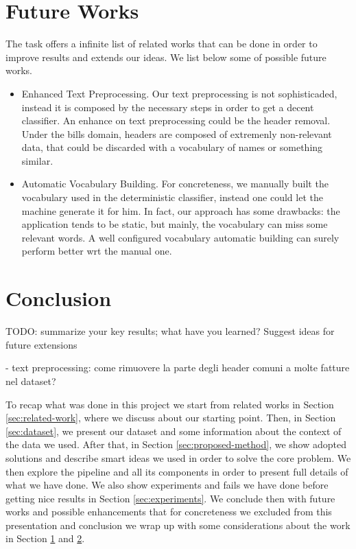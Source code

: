 \documentclass[10pt,twocolumn,letterpaper]{article}
\begin{document}
\section{Future Works}
\label{sec:future-works}

The task offers a infinite list of related works that can be done in
order to improve results and extends our ideas. We list below some of
possible future works.

\begin{itemize}
  \item Enhanced Text Preprocessing. Our text preprocessing is not
    sophisticaded, instead it is composed by the necessary steps in
    order to get a decent classifier. An enhance on text preprocessing
    could be the header removal. Under the bills domain, headers are
    composed of extremenly non-relevant data, that could be discarded
    with a vocabulary of names or something similar.
  \item Automatic Vocabulary Building. For concreteness, we manually
    built the vocabulary used in the deterministic classifier, instead
    one could let the machine generate it for him. In fact, our
    approach has some drawbacks: the application tends to be static,
    but mainly, the vocabulary can miss some relevant words. A well
    configured vocabulary automatic building can surely perform better
    wrt the manual one. 
\end{itemize}

\section{Conclusion}
\label{sec:conclusion}

TODO: summarize your key results; what have you
learned? Suggest ideas for future extensions

- text preprocessing: come rimuovere la parte degli header comuni a molte fatture nel dataset?

To recap what was done in this project we start from related works in Section
\ref{sec:related-work}, where we discuss about our starting
point. Then, in Section \ref{sec:dataset}, we present our dataset and
some information about the context of the data we used. After that, in
Section \ref{sec:proposed-method}, we show adopted solutions and
describe smart ideas we used in order to solve the core problem. We
then explore the pipeline and all its components in order to present
full details of what we have done. We also show experiments and fails
we have done before getting nice results in Section
\ref{sec:experiments}. We conclude then with future works and possible
enhancements that for concreteness we excluded from this presentation
and conclusion we wrap up with some considerations about the work in
Section \ref{sec:future-works} and \ref{sec:conclusion}.

{\small


}
\end{document}
